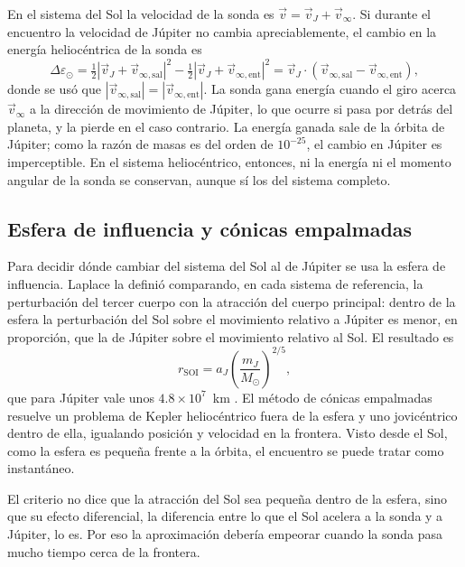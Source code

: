 \documentclass[12pt,letterpaper]{article}
\begin{document}
En el sistema del Sol la velocidad de la sonda es $\vec v = \vec v_J + \vec v_\infty$. Si
durante el encuentro la velocidad de Júpiter no cambia apreciablemente, el cambio en la
energía heliocéntrica de la sonda es
\begin{equation}
\Delta\varepsilon_\odot = \tfrac12|\vec v_J+\vec v_{\infty,\mathrm{sal}}|^2
                       - \tfrac12|\vec v_J+\vec v_{\infty,\mathrm{ent}}|^2
                       = \vec v_J\cdot\left(\vec v_{\infty,\mathrm{sal}}
                         - \vec v_{\infty,\mathrm{ent}}\right),
\end{equation}
donde se usó que $|\vec v_{\infty,\mathrm{sal}}| = |\vec v_{\infty,\mathrm{ent}}|$. La sonda
gana energía cuando el giro acerca $\vec v_\infty$ a la dirección de movimiento de Júpiter,
lo que ocurre si pasa por detrás del planeta, y la pierde en el caso contrario. La energía
ganada sale de la órbita de Júpiter; como la razón de masas es del orden de $10^{-25}$, el
cambio en Júpiter es imperceptible. En el sistema heliocéntrico, entonces, ni la energía
ni el momento angular de la sonda se conservan, aunque sí los del sistema completo.

\subsection{Esfera de influencia y cónicas empalmadas}

Para decidir dónde cambiar del sistema del Sol al de Júpiter se usa la esfera de influencia.
Laplace la definió comparando, en cada sistema de referencia, la perturbación del tercer
cuerpo con la atracción del cuerpo principal: dentro de la esfera la perturbación del Sol
sobre el movimiento relativo a Júpiter es menor, en proporción, que la de Júpiter sobre el
movimiento relativo al Sol. El resultado es
\begin{equation}
r_{\mathrm{SOI}} = a_J\left(\frac{m_J}{M_\odot}\right)^{2/5},
\end{equation}
que para Júpiter vale unos $4.8\times10^7$~km \cite{murray1999}. El método de cónicas
empalmadas resuelve un problema de Kepler heliocéntrico fuera de la esfera y uno jovicéntrico
dentro de ella, igualando posición y velocidad en la frontera. Visto desde el Sol, como la
esfera es pequeña frente a la órbita, el encuentro se puede tratar como instantáneo.

El criterio no dice que la atracción del Sol sea pequeña dentro de la esfera, sino que su
efecto diferencial, la diferencia entre lo que el Sol acelera a la sonda y a Júpiter, lo es.
Por eso la aproximación debería empeorar cuando la sonda pasa mucho tiempo cerca de la
frontera.
\end{document}

